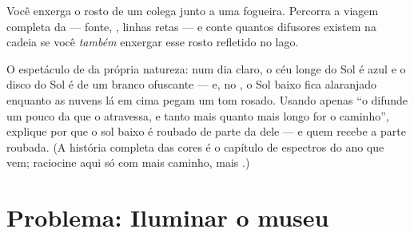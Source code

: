 \begin{exercise}[$\star\star$]\label{exo:g7:light-sources-propagation:11}
Você enxerga o rosto de um colega junto a uma fogueira. Percorra a
viagem completa da  --- fonte, , linhas retas --- e conte
quantos difusores existem na cadeia se você \emph{também} enxergar
esse rosto refletido no lago.
\end{exercise}

\begin{exercise}[$\star\star\star$]\label{exo:g7:light-sources-propagation:12}
O espetáculo de  da própria natureza: num dia claro, o céu longe
do Sol é azul e o disco do Sol é de um branco ofuscante --- e, no , o Sol baixo fica alaranjado enquanto as nuvens lá em cima
pegam um tom rosado. Usando apenas ``o  difunde um pouco da  que
o atravessa, e tanto mais quanto mais longo for o caminho'', explique
por que o sol baixo é roubado de parte da  dele --- e quem recebe
a parte roubada. (A história completa das cores é o capítulo de
espectros do ano que vem; raciocine aqui só com mais caminho, mais
.)
\end{exercise}

\section{Problema: Iluminar o museu}


